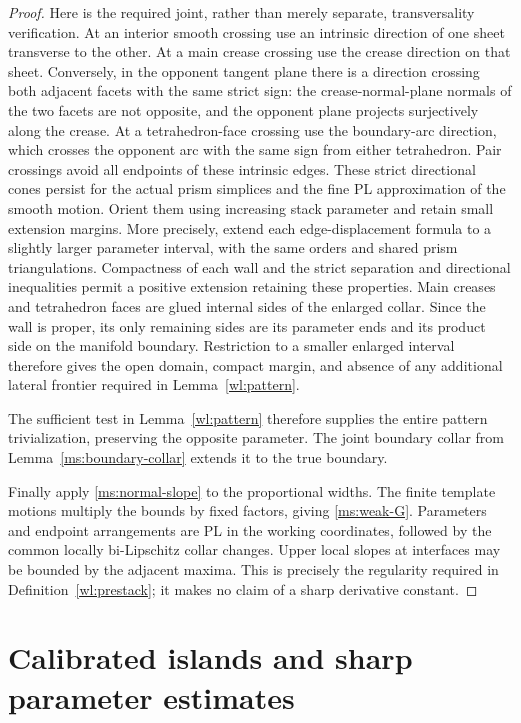 \documentclass[11pt]{article}
\numberwithin{equation}{section}
\theoremstyle{definition}
\theoremstyle{remark}
\begin{document}
\begin{proof}
Here is the required joint, rather than merely separate,
transversality verification.  At an interior smooth crossing use
an intrinsic direction of one sheet transverse to the other.  At
a main crease crossing use the crease direction on that sheet.
Conversely, in the opponent tangent plane there is a direction
crossing both adjacent facets with the same strict sign: the
crease-normal-plane normals of the two facets are not opposite,
and the opponent plane projects surjectively along the crease.
At a tetrahedron-face crossing use the boundary-arc direction,
which crosses the opponent arc with the same sign from either
tetrahedron.  Pair crossings avoid all endpoints of these intrinsic
edges.  These strict directional cones persist for the actual
prism simplices and the fine PL approximation of the smooth
motion.  Orient them using increasing stack parameter and retain
small extension margins.  More precisely, extend each
edge-displacement formula to a slightly larger parameter interval,
with the same orders and shared prism triangulations.  Compactness
of each wall and the strict separation and directional inequalities
permit a positive extension retaining these properties.  Main
creases and tetrahedron faces are glued internal sides of the
enlarged collar.  Since the wall is proper, its only remaining sides
are its parameter ends and its product side on the manifold
boundary.  Restriction to a smaller enlarged interval therefore
gives the open domain, compact margin, and absence of any additional
lateral frontier required in Lemma~\ref{wl:pattern}.

The sufficient test in Lemma~\ref{wl:pattern}
therefore supplies the entire pattern trivialization, preserving
the opposite parameter.  The joint boundary collar from
Lemma~\ref{ms:boundary-collar} extends it to the true boundary.

Finally apply \eqref{ms:normal-slope} to the proportional widths.
The finite template motions multiply the bounds by fixed factors,
giving \eqref{ms:weak-G}.  Parameters and endpoint arrangements are
PL in the working coordinates, followed by the common locally
bi-Lipschitz collar changes.  Upper local slopes at interfaces may
be bounded by the adjacent maxima.  This is precisely the
regularity required in Definition~\ref{wl:prestack}; it makes no claim of a
sharp derivative constant.
\end{proof}

\section{Calibrated islands and sharp parameter estimates}
\label{sec:calibrated-islands}
\end{document}
